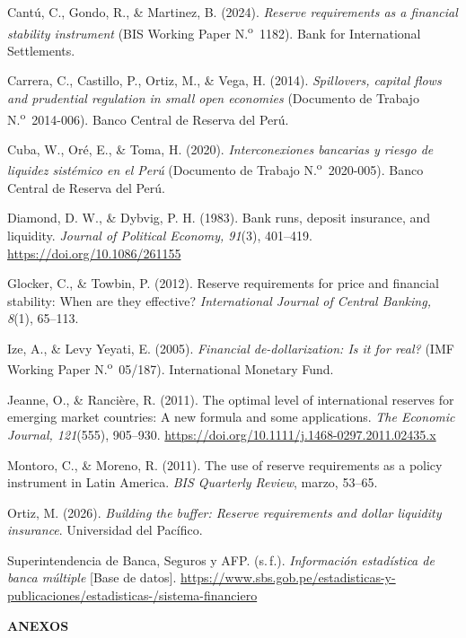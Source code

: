 \documentclass[11pt,a4paper]{article}
\newenvironment{refs}
{\begin{list}{}{\setlength{\leftmargin}{2em}\setlength{\itemindent}{-2em}\setlength{\itemsep}{6pt}\setlength{\parsep}{0pt}}\RaggedRight}
{\end{list}}
\begin{document}
\begin{refs}
\item Cantú, C., Gondo, R., \& Martinez, B. (2024). \textit{Reserve requirements as a financial stability instrument} (BIS Working Paper N.\textsuperscript{o}~1182). Bank for International Settlements.
\item Carrera, C., Castillo, P., Ortiz, M., \& Vega, H. (2014). \textit{Spillovers, capital flows and prudential regulation in small open economies} (Documento de Trabajo N.\textsuperscript{o}~2014-006). Banco Central de Reserva del Perú.
\item Cuba, W., Oré, E., \& Toma, H. (2020). \textit{Interconexiones bancarias y riesgo de liquidez sistémico en el Perú} (Documento de Trabajo N.\textsuperscript{o}~2020-005). Banco Central de Reserva del Perú.
\item Diamond, D. W., \& Dybvig, P. H. (1983). Bank runs, deposit insurance, and liquidity. \textit{Journal of Political Economy, 91}(3), 401--419. \url{https://doi.org/10.1086/261155}
\item Glocker, C., \& Towbin, P. (2012). Reserve requirements for price and financial stability: When are they effective? \textit{International Journal of Central Banking, 8}(1), 65--113.
\item Ize, A., \& Levy Yeyati, E. (2005). \textit{Financial de-dollarization: Is it for real?} (IMF Working Paper N.\textsuperscript{o}~05/187). International Monetary Fund.
\item Jeanne, O., \& Rancière, R. (2011). The optimal level of international reserves for emerging market countries: A new formula and some applications. \textit{The Economic Journal, 121}(555), 905--930. \url{https://doi.org/10.1111/j.1468-0297.2011.02435.x}
\item Montoro, C., \& Moreno, R. (2011). The use of reserve requirements as a policy instrument in Latin America. \textit{BIS Quarterly Review}, marzo, 53--65.
\item Ortiz, M. (2026). \textit{Building the buffer: Reserve requirements and dollar liquidity insurance}. Universidad del Pacífico.
\item Superintendencia de Banca, Seguros y AFP. (s.\,f.). \textit{Información estadística de banca múltiple} [Base de datos]. \url{https://www.sbs.gob.pe/estadisticas-y-publicaciones/estadisticas-/sistema-financiero}
\end{refs}

\clearpage
\begin{center}\textbf{ANEXOS}\end{center}\label{sec:anexos}
\clearpage
\singlespacing
{}\label{sec:anexo-ia}

\clearpage
\end{document}
